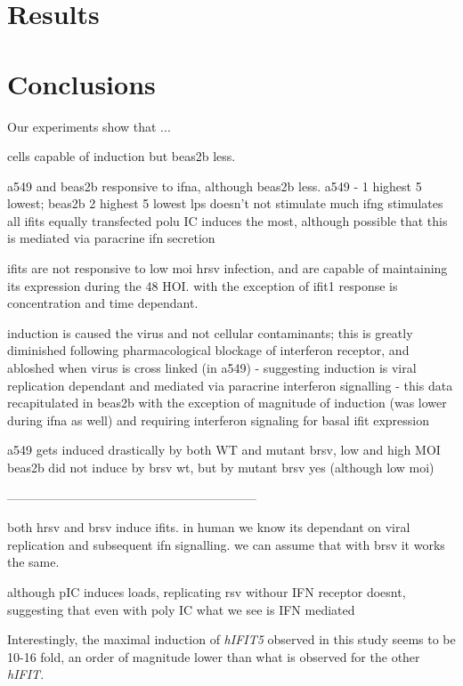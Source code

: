 \section{Results} \label{sec:Results-Chapter 1}


\section{Conclusions} \label{sec:Conclusions Chapter 1}
Our experiments show that ...

cells capable of induction but beas2b less. 

a549 and beas2b responsive to ifna, although beas2b less. a549 - 1 highest 5 lowest; beas2b 2 highest 5 lowest
lps doesn't not stimulate much
ifng stimulates all ifits equally
transfected polu IC induces the most, although possible that this is mediated via paracrine ifn secretion

ifits are not responsive to low moi hrsv infection, and are capable of maintaining its expression during the 48 HOI. with the exception of ifit1 response is concentration and time dependant.

induction is caused the virus and not cellular contaminants; this is greatly diminished following pharmacological blockage of interferon receptor, and abloshed when virus is cross linked (in a549)
- suggesting induction is viral replication dependant and mediated via paracrine interferon signalling
- this data recapitulated in beas2b with the exception of magnitude of induction (was lower during ifna as well) and requiring interferon signaling for basal ifit expression

a549 gets induced drastically by both WT and mutant brsv, low and high MOI
beas2b did not induce by brsv wt, but by mutant brsv yes (although low moi)




------------------------------------------------------------



both hrsv and brsv induce ifits. in human we know its dependant on viral replication and subsequent ifn signalling. we can assume that with brsv it works the same.

although pIC induces loads, replicating rsv withour IFN receptor doesnt, suggesting that even with poly IC what we see is IFN mediated



Interestingly, the maximal induction of \textit{hIFIT5} observed in this study seems to be 10-16 fold, an order of magnitude lower than what is observed for the other \textit{hIFIT}.


